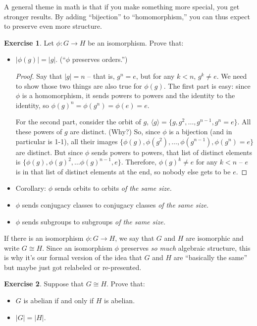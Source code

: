 \documentclass[12pt]{article}
\theoremstyle{definition} %
\newtheorem*{exercise}{Exercise}
\newcommand{\Alert}[1]{\textcolor{xRed}{#1}}
\def\<{\langle}
\def\>{\rangle}
\begin{document}
A general theme in math is that if you make something more special, you get stronger results. By adding ``bijection'' to ``homomorphism,'' you can thus expect to preserve even more structure.

\begin{exercise} Let $\phi:G\to H$ be an isomorphism. Prove that:
    \begin{itemize}
        \item $|\phi(g)| = |g|$. (``$\phi$ preserves orders.'')
        \begin{proof}
            Say that $|g| = n$ -- that is, $g^n = e$, but for any $k < n$, $g^k \neq e$. We need to show those two things are also true for $\phi(g)$. The first part is easy: since $\phi$ is a homomorphism, it sends powers to powers and the identity to the identity, so $\phi(g)^n = \phi(g^n) = \phi(e) = e$.

            For the second part, consider the orbit of $g$, $\<g\> = \{g, g^2, \ldots, g^{n-1}, g^n = e\}$. All these powers of $g$ are distinct. (Why?) So, since $\phi$ is a bijection (and in particular is 1-1), all their images $\{\phi(g), \phi(g^2), \ldots, \phi(g^{n-1}), \phi(g^n) = e\}$ are distinct. But since $\phi$ sends powers to powers, that list of distinct elements is $\{\phi(g), \phi(g)^2, \ldots \phi(g)^{n-1}, e\}$. Therefore, $\phi(g)^k\neq e$ for any $k < n$ -- $e$ is in that list of distinct elements at the end, so nobody else gets to be $e$.
        \end{proof}
        \item Corollary: $\phi$ sends orbits to orbits \textit{of the same size.}
        \item $\phi$ sends conjugacy classes to conjugacy classes \textit{of the same size.}
        \item $\phi$ sends subgroups to subgroups \textit{of the same size.}
    \end{itemize}
\end{exercise}

If there is an isomorphism $\phi:G \to H$, we say that $G$ and $H$ are \Alert{isomorphic} and write $G\cong H$. Since an isomorphism $\phi$ preserves \textit{so much} algebraic structure, this is why it's our formal version of the idea that $G$ and $H$ are ``basically the same'' but maybe just got relabeled or re-presented.

\begin{exercise} Suppose that $G\cong H$. Prove that:
    \begin{itemize}
        \item $G$ is abelian if and only if $H$ is abelian.
        \item $|G| = |H|$.
    \end{itemize}
\end{exercise}
\end{document}
